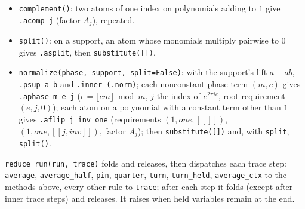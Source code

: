 \begin{itemize}
  on one polynomial (\textnormal{\texttt{.\allowbreak{}apick}}, \textnormal{\texttt{.\allowbreak{}amerge j j1 j2}}, requirement $(1,j,[[j_1,j_2]])$);
  finally \textnormal{\texttt{complement(\allowbreak{})}}.
\item \textnormal{\texttt{complement(\allowbreak{})}}: two atoms of one index on polynomials adding to $1$ give \textnormal{\texttt{.\allowbreak{}acomp j}}
  (factor $A_j$), repeated.
\item \textnormal{\texttt{split(\allowbreak{})}}: on a support, an atom whose monomials multiply pairwise to $0$ gives
  \textnormal{\texttt{.\allowbreak{}asplit}}, then \textnormal{\texttt{substitute(\allowbreak{}[])}}.
\item \textnormal{\texttt{normalize(\allowbreak{}phase,\allowbreak{} support,\allowbreak{} split=False)}}: with the support's lift $a+ab$, \textnormal{\texttt{.\allowbreak{}psup a b}}
  and \textnormal{\texttt{.\allowbreak{}inner (\allowbreak{}.\allowbreak{}norm)}}; each nonconstant phase term $(m,c)$ gives \textnormal{\texttt{.\allowbreak{}aphase m e j}}
  ($e=\lfloor cm\rfloor\bmod m$, $j$ the index of $e^{2\pi ic}$, root requirement $(e,j,0)$); each
  atom on a polynomial with a constant term other than $1$ gives \textnormal{\texttt{.\allowbreak{}aflip j inv one}}
  (requirements $(1,\mathit{one},[[]])$, $(1,\mathit{one},[[j,\mathit{inv}]])$, factor $A_j$); then
  \textnormal{\texttt{substitute(\allowbreak{}[])}} and, with \textnormal{\texttt{split}}, \textnormal{\texttt{split(\allowbreak{})}}.
\end{itemize}
\textnormal{\texttt{reduce\_\allowbreak{}run(\allowbreak{}run,\allowbreak{} trace)}} folds and releases, then dispatches each trace step: \textnormal{\texttt{average}},
\textnormal{\texttt{average\_\allowbreak{}half}}, \textnormal{\texttt{pin}}, \textnormal{\texttt{quarter}}, \textnormal{\texttt{turn}}, \textnormal{\texttt{turn\_\allowbreak{}held}}, \textnormal{\texttt{average\_\allowbreak{}ctx}} to the
methods above, every other rule to \textnormal{\texttt{trace}}; after each step it folds (except after inner trace
steps) and releases. It raises when held variables remain at the end.

\subsection{\texorpdfstring{}{lean\_qdigits}}

